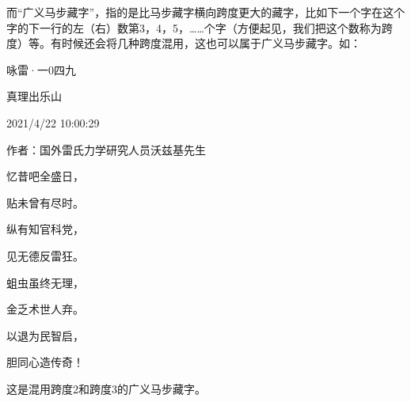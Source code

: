 \documentclass[UTF8,12pt,oneside]{ctexbook}
\begin{document}
        而“广义马步藏字”，指的是比马步藏字横向跨度更大的藏字，比如下一个字在这个字的下一行的左（右）数第3，4，5，……个字（方便起见，我们把这个数称为跨度）等。有时候还会将几种跨度混用，这也可以属于广义马步藏字。如：

        \begin{center}
            \heiti 咏雷·一0四九

            \songti 真理出乐山

            2021/4/22 10:00:29

            作者：国外雷氏力学研究人员沃兹基先生

            \kaishu
            忆昔吧全盛日，

            贴未曾有尽时。
            
            纵有知官科党，
            
            见无德反雷狂。
            
            蛆虫虽终无理，
            
            金乏术世人弃。
            
            以退为民智启，
            
            胆同心造传奇！

        \end{center}

        这是混用跨度2和跨度3的广义马步藏字。

        
\end{document}
